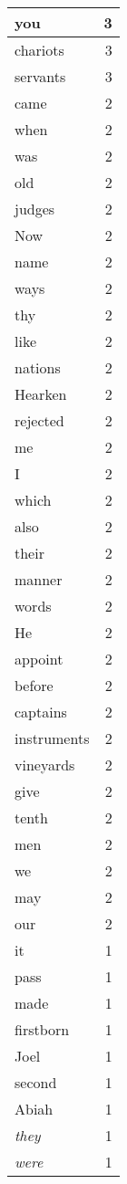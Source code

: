 \begin{center}
\begin{longtable}{l|r}
you & 3 \\ \hline
chariots & 3 \\ \hline
servants & 3 \\ \hline
came & 2 \\ \hline
when & 2 \\ \hline
was & 2 \\ \hline
old & 2 \\ \hline
judges & 2 \\ \hline
Now & 2 \\ \hline
name & 2 \\ \hline
ways & 2 \\ \hline
thy & 2 \\ \hline
like & 2 \\ \hline
nations & 2 \\ \hline
Hearken & 2 \\ \hline
rejected & 2 \\ \hline
me & 2 \\ \hline
I & 2 \\ \hline
which & 2 \\ \hline
also & 2 \\ \hline
their & 2 \\ \hline
manner & 2 \\ \hline
words & 2 \\ \hline
He & 2 \\ \hline
appoint & 2 \\ \hline
before & 2 \\ \hline
captains & 2 \\ \hline
instruments & 2 \\ \hline
vineyards & 2 \\ \hline
give & 2 \\ \hline
tenth & 2 \\ \hline
men & 2 \\ \hline
we & 2 \\ \hline
may & 2 \\ \hline
our & 2 \\ \hline
it & 1 \\ \hline
pass & 1 \\ \hline
made & 1 \\ \hline
firstborn & 1 \\ \hline
Joel & 1 \\ \hline
second & 1 \\ \hline
Abiah & 1 \\ \hline
\emph{they} & 1 \\ \hline
\emph{were} & 1 \\ \hline

\end{longtable}
\end{center}
